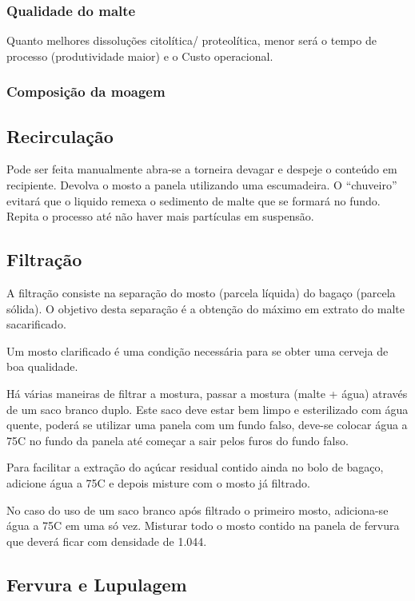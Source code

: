 \subsubsection{Qualidade do malte}
Quanto melhores dissoluções citolítica/ proteolítica, menor será o tempo de processo (produtividade maior) e o Custo operacional.

\subsubsection{Composição da moagem}

\subsection{Recirculação}

Pode ser feita manualmente abra-se a torneira devagar e despeje o conteúdo em recipiente. Devolva o mosto a panela utilizando uma escumadeira. O “chuveiro” evitará que o liquido remexa o sedimento de malte que se formará no fundo. Repita o processo até não haver mais partículas em suspensão.

\subsection{Filtração}

A filtração consiste na separação do mosto (parcela líquida) do bagaço (parcela sólida). O objetivo desta separação é a obtenção do máximo em extrato do malte sacarificado.

Um mosto clarificado é uma condição necessária para se obter uma cerveja de boa qualidade.

Há várias maneiras de filtrar a mostura, passar a mostura (malte + água) através de um saco branco duplo. Este saco deve estar bem limpo e esterilizado com água quente, poderá se utilizar uma panela com um fundo falso, deve-se colocar água a 75\textdegree C no fundo da panela até começar a sair pelos furos do fundo falso.

Para facilitar a extração do açúcar residual contido ainda no bolo de bagaço, adicione água a 75\textdegree C e depois misture com o mosto já filtrado.

No caso do uso de um saco branco após filtrado o primeiro mosto, adiciona-se água a 75\textdegree C em uma só vez. Misturar todo o mosto contido na panela de fervura que deverá ficar com densidade de 1.044.

\subsection{Fervura e Lupulagem}

